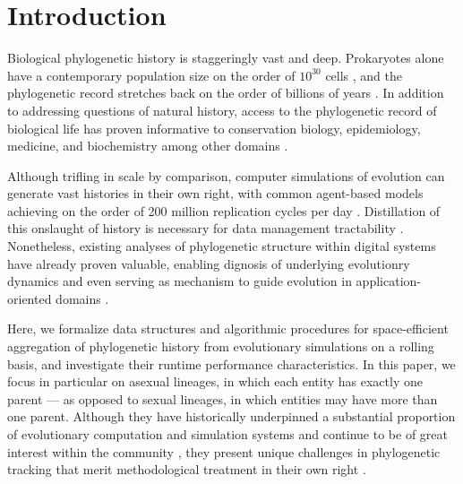 \section{Introduction} \label{sec:introduction}

Biological phylogenetic history is staggeringly vast and deep.
Prokaryotes alone have a contemporary population size on the order of $10^{30}$ cells \citep{whitman1998prokaryotes}, and the phylogenetic record stretches back on the order of billions of years \citep{arndt2012processes}.
In addition to addressing questions of natural history, access to the phylogenetic record of biological life has proven informative to conservation biology, epidemiology, medicine, and biochemistry among other domains \citep{faithConservationEvaluationPhylogenetic1992, STAMATAKIS2005phylogenetics, frenchHostPhylogenyShapes2023,kim2006discovery}.

Although trifling in scale by comparison, computer simulations of evolution can generate vast histories in their own right, with common agent-based models achieving on the order of 200 million replication cycles per day \citep{ofria2009avida}.
Distillation of this onslaught of history is necessary for data management tractability \citep{dolson2020interpreting}.
Nonetheless, existing analyses of phylogenetic structure within digital systems have already proven valuable, enabling dignosis of underlying evolutionry dynamics \citep{moreno2023toward,hernandez2022can,shahbandegan2022untangling, lewinsohnStatedependentEvolutionaryModels2023a} and even serving as mechanism to guide evolution in application-oriented domains \cite{lalejini2024phylogeny,lalejini2024runtime,murphy2008simple,burke2003increased}.

Here, we formalize data structures and algorithmic procedures for space-efficient aggregation of phylogenetic history from evolutionary simulations on a rolling basis, and investigate their runtime performance characteristics.
In this paper, we focus in particular on asexual lineages, in which each entity has exactly one parent --- as opposed to sexual lineages, in which entities may have more than one parent.
Although they have historically underpinned a substantial proportion of evolutionary computation and simulation systems \citep{koza1994genetic,jefferson1990evolution} and continue to be of great interest within the community \citep{dang2018escaping}, they present unique challenges in phylogenetic tracking that merit methodological treatment in their own right \citep{godin2019apoget,moreno2024methods,mcphee2018detailed}.


